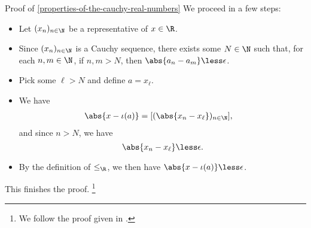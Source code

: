 \begin{Proof}{Proof of \cref{properties-of-the-cauchy-real-numbers}}
    We proceed in a few steps:
    \begin{itemize}
        \item Let $(x_{n})_{n\in\N}$ be a representative of $x\in\R$.
        \item Since $(x_{n})_{n\in\N}$ is a Cauchy sequence, there exists some $N\in\N$ such that, for each $n,m\in\N$, if $n,m\greater N$, then $\abs{a_{n}-a_{m}}\less\epsilon$.
        \item Pick some $\ell\greater N$ and define $a=x_{\ell}$.
        \item We have
            \begin{align*}
                \abs{x-\iota(a)} &= [(\abs{x_{n}-x_{\ell}})_{n\in\N}],
            \end{align*}
            and since $n\greater N$, we have
            \[
                \abs{x_{n}-x_{\ell}}%
                \less%
                \epsilon.%
            \]%
        \item By the definition of $\leq_{\R}$, we then have $\abs{x-\iota(a)}\less\epsilon$.
    \end{itemize}
    This finishes the proof.%
    \footnote{%
        We follow the proof given in \cite[Theorem 4.12]{kemp:cauchy-s-construction-of-r}.
    }%


\end{Proof}
